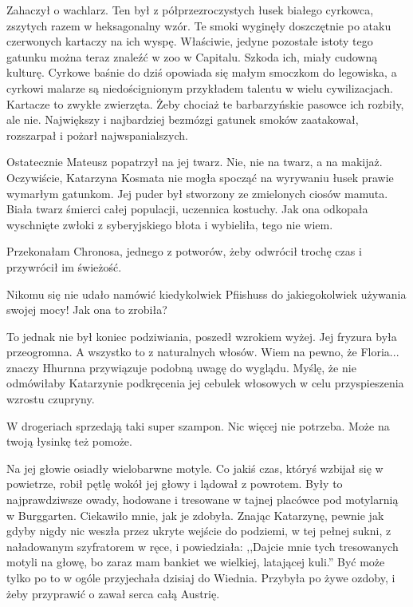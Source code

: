 Zahaczył o wachlarz.
Ten był z półprzezroczystych łusek białego cyrkowca, zszytych razem w heksagonalny wzór.
Te smoki wyginęły doszczętnie po ataku czerwonych kartaczy na ich wyspę.
Właściwie, jedyne pozostałe istoty tego gatunku można teraz znaleźć w zoo w Capitalu.
Szkoda ich, miały cudowną kulturę.
Cyrkowe baśnie do dziś opowiada się małym smoczkom do legowiska, a cyrkowi malarze są niedoścignionym przykładem talentu w wielu cywilizacjach.
Kartacze to zwykłe zwierzęta. Żeby chociaż te barbarzyńskie pasowce ich rozbiły, ale nie. 
Największy i najbardziej bezmózgi gatunek smoków zaatakował, rozszarpał i pożarł najwspanialszych.

Ostatecznie Mateusz popatrzył na jej twarz.
Nie, nie na twarz, a na makijaż.
Oczywiście, Katarzyna Kosmata nie mogła spocząć na wyrywaniu łusek prawie wymarłym gatunkom.
Jej puder był stworzony ze zmielonych ciosów mamuta. Biała twarz śmierci całej populacji, uczennica kostuchy.
Jak ona odkopała wyschnięte zwłoki z syberyjskiego błota i wybieliła, tego nie wiem.
\begin{dialogue}
\ds{} Przekonałam Chronosa, jednego z potworów, żeby odwrócił trochę czas i przywrócił im świeżość.
\end{dialogue}

Nikomu się nie udało namówić kiedykolwiek Pfiishuss do jakiegokolwiek używania swojej mocy! Jak ona to zrobiła?

To jednak nie był koniec podziwiania, poszedł wzrokiem wyżej.
Jej fryzura była przeogromna. A wszystko to z naturalnych włosów. 
Wiem na pewno, że Floria... znaczy Hhurnna przywiązuje podobną uwagę do wyglądu. 
Myślę, że nie odmówiłaby Katarzynie podkręcenia jej cebulek włosowych w celu przyspieszenia wzrostu czupryny.
\begin{dialogue}
\ds{} W drogeriach sprzedają taki super szampon. Nic więcej nie potrzeba. Może na twoją łysinkę też pomoże. 
\end{dialogue}

Na jej głowie osiadły wielobarwne motyle. 
Co jakiś czas, któryś wzbijał się w powietrze, robił pętlę wokół jej głowy i lądował z powrotem.
Były to najprawdziwsze owady, hodowane i tresowane w tajnej placówce pod motylarnią w Burggarten.
Ciekawiło mnie, jak je zdobyła. Znając Katarzynę, pewnie jak gdyby nigdy nic weszła przez ukryte wejście do podziemi, w tej pełnej sukni, z naładowanym szyfratorem w ręce, i powiedziała:
,,Dajcie mnie tych tresowanych motyli na głowę, bo zaraz mam bankiet we wielkiej, latającej kuli.''
Być może tylko po to w ogóle przyjechała dzisiaj do Wiednia.
Przybyła po żywe ozdoby, i żeby przyprawić o zawał serca całą Austrię.


